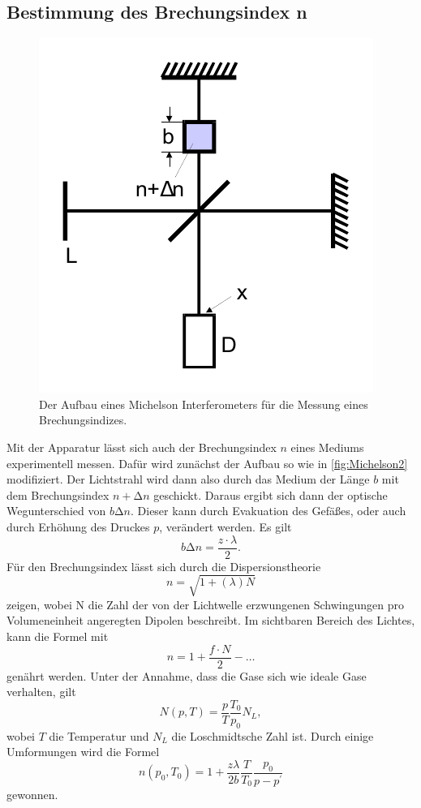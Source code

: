 \subsection{Bestimmung des Brechungsindex n}

\begin{figure}
    \centering
    \includegraphics[width=0.4 \linewidth]{pictures/Michelson2.pdf}
    \caption{Der Aufbau eines Michelson Interferometers für die Messung eines Brechungsindizes.}
    \label{fig:Michelson2}
\end{figure}

Mit der Apparatur lässt sich auch der Brechungsindex $n$ eines Mediums experimentell messen.
Dafür wird zunächst der Aufbau so wie in \autoref{fig:Michelson2} modifiziert. 
Der Lichtstrahl wird dann also durch das Medium der Länge $b$ mit dem Brechungsindex $n + \increment n$ geschickt.
Daraus ergibt sich dann der optische Wegunterschied von $ b \increment n$.
Dieser kann durch Evakuation des Gefäßes, oder auch durch Erhöhung des Druckes $p$, verändert werden.
Es gilt
\begin{equation}
    b \increment n = \frac{z \cdot \lambda}{2}.
\end{equation}
Für den Brechungsindex lässt sich durch die Dispersionstheorie 
\begin{equation}
    n = \sqrt{1 + (\lambda) N}
\end{equation}
zeigen, wobei N die Zahl der von der Lichtwelle erzwungenen Schwingungen pro Volumeneinheit angeregten Dipolen beschreibt.
Im sichtbaren Bereich des Lichtes, kann die Formel mit
\begin{equation}
    n = 1 + \frac{f \cdot N}{2} - \dots
\end{equation}
genährt werden.
Unter der Annahme, dass die Gase sich wie ideale Gase verhalten, gilt
\begin{equation*}
    N (p, T) = \frac{p}{T}\frac{T_0}{p_0} N_L ,
\end{equation*}
wobei $T$ die Temperatur und $N_L$ die Loschmidtsche Zahl ist.
Durch einige Umformungen wird die Formel
\begin{equation}
    n\left(p_{0}, T_{0}\right)=1+\frac{z \lambda}{2 b} \frac{T}{T_{0}} \frac{p_{0}}{p-p^{\prime}}
\end{equation}
gewonnen.